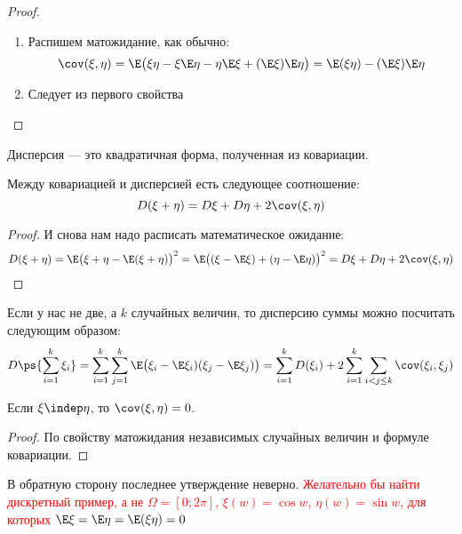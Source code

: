 \begin{proof}~
	\begin{enumerate}
		\item Распишем матожидание, как обычно:
		\[
			\cov(\xi, \eta) = \E\big(\xi\eta - \xi\E\eta - \eta\E\xi + (\E\xi)\E\eta\big) = \E(\xi\eta) - (\E\xi)\E\eta
		\]
		
		\item Следует из первого свойства
	\end{enumerate}
\end{proof}

\begin{corollary}
	Дисперсия --- это квадратичная форма, полученная из ковариации.
\end{corollary}

\begin{proposition}
	Между ковариацией и дисперсией есть следующее соотношение:
	\[
		D(\xi + \eta) = D\xi + D\eta + 2\cov(\xi, \eta)
	\]
\end{proposition}

\begin{proof}
	И снова нам надо расписать математическое ожидание:
	\[
		D(\xi + \eta) = \E\big(\xi + \eta - \E(\xi + \eta)\big)^2 = \E\big((\xi - \E\xi) + (\eta - \E\eta)\big)^2 = D\xi + D\eta + 2\cov(\xi, \eta)
	\]
\end{proof}

\begin{corollary}
	Если у нас не две, а $k$ случайных величин, то дисперсию суммы можно посчитать следующим образом:
	\[
		D\ps{\sum_{i = 1}^k \xi_i} = \sum_{i = 1}^k \sum_{j = 1}^k \E\big(\xi_i - \E\xi_i)(\xi_j - \E\xi_j)\big) = \sum_{i = 1}^k D(\xi_i) + 2\sum_{i = 1}^k \sum_{i < j \le k} \cov(\xi_i, \xi_j)
	\]
\end{corollary}


\begin{proposition}
	Если $\xi \indep \eta$, то $\cov(\xi, \eta) = 0$.
\end{proposition}

\begin{proof}
	По свойству матожидания независимых случайных величин и формуле ковариации.
\end{proof}

\begin{note}
	В обратную сторону последнее утверждение неверно.
	\textcolor{red}{
		Желательно бы найти дискретный пример, а не $\Omega = [0; 2\pi]$, $\xi(w) = \cos w$, $\eta(w) = \sin w$, для которых $\E\xi = \E\eta = \E(\xi\eta) = 0$
	}
\end{note}

